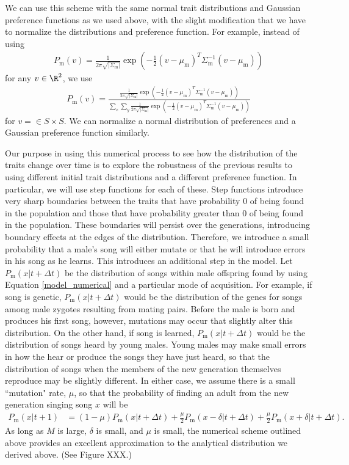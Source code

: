 \documentclass{article}
\newcommand{\x}[1]{\text{#1}}
\begin{document}
We can use this scheme with the same normal trait distributions and Gaussian preference functions as we used above, with the slight modification that we have to normalize the distributions and preference function. For example, instead of using 
\begin{align*}
P_\x{m}(v)=\frac{1}{2\pi\sqrt{|\Sigma_\x{m}|}}\exp\left(-\frac{1}{2}(v-\mu_\x{m})^T\Sigma_\x{m}^{-1}(v-\mu_\x{m})\right)
\end{align*}
for any $v\in\R^2$, we use
\begin{align*}
P_\x{m}(v)=\frac{\frac{1}{2\pi\sqrt{|\Sigma_\x{m}|}}\exp\left(-\frac{1}{2}(v-\mu_\x{m})^T\Sigma_\x{m}^{-1}(v-\mu_\x{m})\right)}{\sum_x\sum_y\frac{1}{2\pi\sqrt{|\Sigma_\x{m}|}}\exp\left(-\frac{1}{2}(v-\mu_\x{m})^T\Sigma_\x{m}^{-1}(v-\mu_\x{m})\right)}
\end{align*}
for $v=\in S\times S$. We can normalize a normal distribution of preferences and a Gaussian preference function similarly. 

Our purpose in using this numerical process to see how the distribution of the traits change over time is to explore the robustness of the previous results to using different initial trait distributions and a different preference function. In particular, we will use step functions for each of these.  Step functions introduce very sharp boundaries between the traits that have probability $0$ of being found in the population and those that have probability greater than $0$ of being found in the population. These boundaries will persist over the generations, introducing boundary effects at the edges of the distribution. Therefore, we introduce a small probability that a male's song will either mutate or that he will introduce errors in his song as he learns. This introduces an additional step in the model. Let $P_\x{m}\left(x|t+\Delta t\right)$ be the distribution of songs within male offspring found by using Equation \ref{model_numerical} and a particular mode of acquisition. For example, if song is genetic, $P_\x{m}\left(x|t+\Delta t\right)$ would be the distribution of the genes for songs among male zygotes resulting from mating pairs. Before the male is born and produces his first song, however, mutations may occur that slightly alter this distribution. On the other hand, if song is learned, $P_\x{m}\left(x|t+\Delta t\right)$ would be the distribution of songs heard by young males. Young males may make small errors in how the hear or produce the songs they have just heard, so that the distribution of songs when the members of the new generation themselves reproduce may be slightly different. In either case, we assume there is a small ``mutation" rate, $\mu$, so that the probability of finding an adult from the new generation singing song $x$ will be 
\begin{align*}
P_\x{m}(x|t+1)&=(1-\mu)P_\x{m}(x|t+\Delta t)+\frac{\mu}{2}P_\x{m}(x-\delta|t+\Delta t)+\frac{\mu}{2}P_\x{m}(x+\delta|t+\Delta t).
\end{align*}  
As long as $M$ is large, $\delta$ is small, and $\mu$ is small, the numerical scheme outlined above provides an excellent approximation to the analytical distribution we derived above. (See Figure XXX.)
\end{document}
